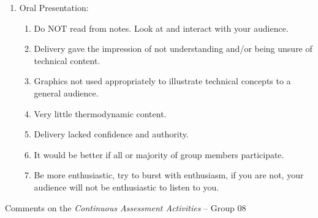 \documentclass[14pt,twoside]{report}
\begin{document}
\begin{enumerate}
\item Oral Presentation:
\begin{enumerate}
%
\item Do NOT read from notes. Look at and interact with your audience.
%
\item Delivery gave the impression of not understanding and/or being unsure of technical content.
%
\item Graphics not used appropriately to illustrate technical concepts to a general audience. 
%
\item Very little thermodynamic content.
%
\item Delivery lacked confidence and authority.
%
\item It would be better if all or majority of group members participate.
%
\item Be more enthusiastic, try to burst with enthusiasm, if you are not, your audience will not be enthusiastic to listen to you.
%
\end{enumerate}

\end{enumerate}


\clearpage



\bigskip

\begin{center}
  {\Large Comments on the {\it Continuous Assessment Activities} -- Group 08}
\end{center}
\end{document}
